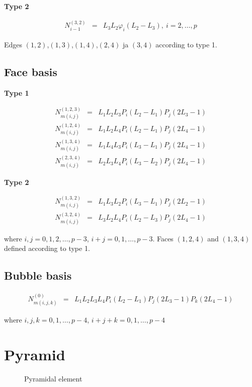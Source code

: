\noindent \textbf{Type 2}

\begin{eqnarray*}
N_{i-1}^{(3,2)}&=&L_3L_2\varphi_i(L_2-L_3),\ i=2,\ldots,p
\end{eqnarray*}

\noindent Edges $(1,2)$,$(1,3)$,$(1,4)$,$(2,4)$ ja $(3,4)$ according to type 1.

\subsection{Face basis}

\noindent \textbf{Type 1}

\begin{eqnarray*}
N_{m(i,j)}^{(1,2,3)}&=&L_1L_2L_3P_i(L_2-L_1)P_j(2L_3-1) \\
N_{m(i,j)}^{(1,2,4)}&=&L_1L_2L_4P_i(L_2-L_1)P_j(2L_4-1) \\
N_{m(i,j)}^{(1,3,4)}&=&L_1L_4L_3P_i(L_3-L_1)P_j(2L_4-1) \\
N_{m(i,j)}^{(2,3,4)}&=&L_2L_3L_4P_i(L_3-L_2)P_j(2L_4-1) 
\end{eqnarray*}

\noindent \textbf{Type 2}

\begin{eqnarray*}
N_{m(i,j)}^{(1,3,2)}&=&L_1L_3L_2P_i(L_3-L_1)P_j(2L_2-1) \\
N_{m(i,j)}^{(3,2,4)}&=&L_3L_2L_4P_i(L_2-L_3)P_j(2L_4-1) 
\end{eqnarray*}

\noindent where $i,j=0,1,2,\ldots,p-3$, $i+j=0,1,\ldots,p-3$. Faces $(1,2,4)$ and $(1,3,4)$ defined according to type 1.

\subsection{Bubble basis}

\begin{eqnarray*}
N_{m(i,j,k)}^{(0)}&=&L_1L_2L_3L_4P_i(L_2-L_1)P_j(2L_3-1)P_k(2L_4-1)
\end{eqnarray*}

\noindent where $i,j,k=0,1,\ldots,p-4$, $i+j+k=0,1,\ldots,p-4$ 

\section{Pyramid}

\begin{figure}[tbhp]
\begin{center}

\caption{Pyramidal element}
\end{center}
\end{figure}

